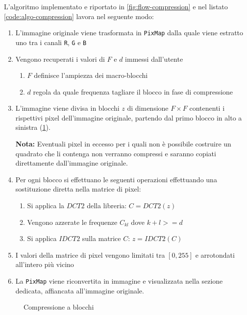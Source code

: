 \documentclass[11pt,italian]{article}
\begin{document}
L'algoritmo implementato e riportato in \cref{fig:flow-compression} e nel listato \ref{code:algo-compression} lavora nel seguente modo:
\begin{enumerate}
    \item L’immagine originale viene trasformata in \lstinline{PixMap} dalla quale viene estratto uno tra i canali \lstinline{R}, \lstinline{G} e \lstinline{B}
	\item Vengono recuperati i valori di $F$ e $d$ immessi dall’utente
	\begin{enumerate}
		\item $F$ definisce l’ampiezza dei macro-blocchi
		\item $d$ regola da quale frequenza tagliare il blocco in fase di compressione
	\end{enumerate}
    \item L’immagine viene divisa in blocchi $z$ di dimensione $F\times F$ contenenti i rispettivi pixel dell'immagine originale, partendo dal primo blocco in alto a sinistra (\cref{fig:flow-compression-block}).

    \textbf{Nota:} Eventuali pixel in eccesso per i quali non è possibile costruire un quadrato che li contenga non verranno compressi e saranno copiati direttamente dall'immagine originale.

	\item Per ogni blocco si effettuano le seguenti operazioni effettuando una sostituzione diretta nella matrice di pixel:
	\begin{enumerate}
		\item Si applica la $\mathit{DCT2}$ della libreria: $C = \mathit{DCT2}(z)$
		\item Vengono azzerate le frequenze $C_{kl}$ dove $k+l >= d$
		\item Si applica $\mathit{IDCT2}$ sulla matrice $C$: $z = \mathit{IDCT2}(C)$
	\end{enumerate}
	\item I valori della matrice di pixel vengono limitati tra $[0,255]$ e arrotondati all'intero più vicino
	\item La \lstinline{PixMap} viene riconvertita in immagine e visualizzata nella sezione dedicata, affiancata all'immagine originale.
\end{enumerate}

\begin{figure}[H]
    \caption{Compressione a blocchi}
    \label{fig:flow-compression-block}
\end{figure}
\end{document}
